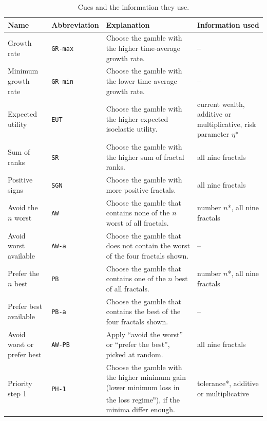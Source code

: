 \begin{table}[t]
  \centering
  \footnotesize
  \renewcommand{\arraystretch}{1.0}
  \setlength{\tabcolsep}{2.4pt}
  \caption{Cues and the information they use.}
  \label{tab:cues}
  \vspace{4pt}
  \begin{threeparttable}
  \begin{tabular}{|>{\raggedright\arraybackslash}p{2.4cm}|l|>{\hspace{0pt}}p{4.85cm}|>{\raggedright\arraybackslash}p{2.5cm}|}
    \hline
    \textbf{Name} & \textbf{Abbreviation} & \textbf{Explanation} & \textbf{Information used} \\
    \hline
    Growth rate & \texttt{GR-max} & Choose the gamble with the higher time-average growth rate. & -- \\
    \hline
    Minimum growth rate & \texttt{GR-min} & Choose the gamble with the lower time-average growth rate. & -- \\
    \hline
    Expected utility & \texttt{EUT} & Choose the gamble with the higher expected isoelastic utility. & current wealth, additive or multiplicative, risk parameter $\eta$* \\
    \hline
    Sum of ranks & \texttt{SR} & Choose the gamble with the higher sum of fractal ranks. & all nine fractals \\
    \hline
    Positive signs & \texttt{SGN} & Choose the gamble with more positive fractals. & all nine fractals \\
    \hline
    Avoid the $n$ worst & \texttt{AW} & Choose the gamble that contains none of the $n$ worst of all fractals. & number $n$*, all nine fractals \\
    \hline
    Avoid worst available & \texttt{AW-a} & Choose the gamble that does not contain the worst of the four fractals shown. & -- \\
    \hline
    Prefer the $n$ best & \texttt{PB} & Choose the gamble that contains one of the $n$ best of all fractals. & number $n$*, all nine fractals \\
    \hline
    Prefer best available & \texttt{PB-a} & Choose the gamble that contains the best of the four fractals shown. & -- \\
    \hline
    Avoid worst or prefer best & \texttt{AW-PB} & Apply ``avoid the worst'' or ``prefer the best'', picked at random. & all nine fractals \\
    \hline
    Priority step 1 & \texttt{PH-1} & Choose the gamble with the higher minimum gain (lower minimum loss in the loss regime\textsuperscript{a}), if the minima differ enough. & tolerance*, additive or multiplicative \\

\end{tabular}
\end{threeparttable}
\end{table}
